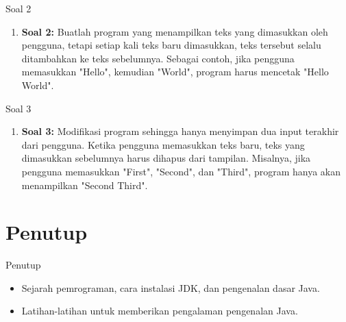 \documentclass[aspectratio=169, table]{beamer}
\begin{document}
\begin{frame}{Soal 2}
	\begin{enumerate}
		\item \textbf{Soal 2:} Buatlah program yang menampilkan teks yang dimasukkan oleh pengguna, tetapi setiap kali teks baru dimasukkan, teks tersebut selalu ditambahkan ke teks sebelumnya. Sebagai contoh, jika pengguna memasukkan "Hello", kemudian "World", program harus mencetak "Hello World".
	\end{enumerate}
\end{frame}

\begin{frame}{Soal 3}
	\begin{enumerate}
		\item \textbf{Soal 3:} Modifikasi program sehingga hanya menyimpan dua input terakhir dari pengguna. Ketika pengguna memasukkan teks baru, teks yang dimasukkan sebelumnya harus dihapus dari tampilan. Misalnya, jika pengguna memasukkan "First", "Second", dan "Third", program hanya akan menampilkan "Second Third".
	\end{enumerate}
\end{frame}

\section{Penutup}
\begin{frame}[fragile]{Penutup}
\begin{itemize}
\item Sejarah pemrograman, cara instalasi JDK, dan pengenalan dasar Java.
\item Latihan-latihan untuk memberikan pengalaman pengenalan Java.
\end{itemize}
\end{frame}
\end{document}
